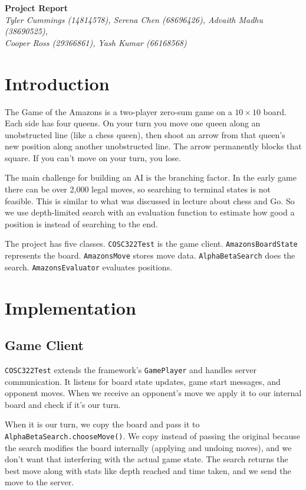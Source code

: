 \documentclass[12pt, letterpaper]{article}
\begin{document}
\begin{center}
{\large \textbf{Project Report}} \\[8pt]
\textit{Tyler Cummings (14814578), Serena Chen (68696426), Advaith Madhu (38690525),} \\
\textit{Cooper Ross (29366861), Yash Kumar (66168568)}
\end{center}

\vspace{6pt}

\section{Introduction}

The Game of the Amazons is a two-player zero-sum game on a $10 \times 10$ board. Each side has four queens. On your turn you move one queen along an unobstructed line (like a chess queen), then shoot an arrow from that queen's new position along another unobstructed line. The arrow permanently blocks that square. If you can't move on your turn, you lose.

The main challenge for building an AI is the branching factor. In the early game there can be over 2,000 legal moves, so searching to terminal states is not feasible. This is similar to what was discussed in lecture about chess and Go. So we use depth-limited search with an evaluation function to estimate how good a position is instead of searching to the end.

The project has five classes. \texttt{COSC322Test} is the game client. \texttt{AmazonsBoardState} represents the board. \texttt{AmazonsMove} stores move data. \texttt{AlphaBetaSearch} does the search. \texttt{AmazonsEvaluator} evaluates positions.

\section{Implementation}

\subsection{Game Client}

\texttt{COSC322Test} extends the framework's \texttt{GamePlayer} and handles server communication. It listens for board state updates, game start messages, and opponent moves. When we receive an opponent's move we apply it to our internal board and check if it's our turn.

When it is our turn, we copy the board and pass it to \texttt{AlphaBetaSearch.chooseMove()}. We copy instead of passing the original because the search modifies the board internally (applying and undoing moves), and we don't want that interfering with the actual game state. The search returns the best move along with stats like depth reached and time taken, and we send the move to the server.
\end{document}
